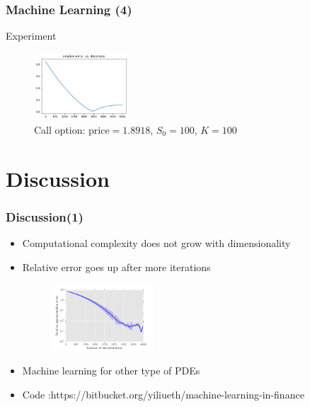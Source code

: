 \documentclass[mathserif,10pt]{beamer}
\begin{document}
\begin{frame}
\frametitle{Machine Learning (4)}
\begin{block}{Experiment}
\begin{figure}
\includegraphics[width=0.6\linewidth, height=2.5cm]{graphics/fig1.png} 
\caption{Call option: price$=1.8918$, $S_0=100$, $K=100$}
\label{fig:subim1}
\end{figure}
%
\end{block}
\end{frame}



\section{Discussion}
\begin{frame}
\frametitle{Discussion(1)}
\begin{itemize}
    \item  Computational complexity does not grow with dimensionality
\end{itemize}
\begin{itemize}
    \item  Relative error goes up after more iterations
\begin{figure}
\includegraphics[width=0.6\linewidth, height=2.5cm]{graphics/fig3.png}
\label{fig:subim2}
\end{figure}
\end{itemize}

\begin{itemize}
    \item  Machine learning for other type of PDEs
\end{itemize}
\begin{itemize}
    \item Code :https://bitbucket.org/yiliueth/machine-learning-in-finance
\end{itemize}
\end{frame}
\end{document}
